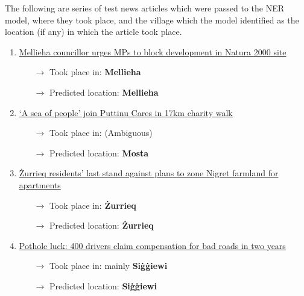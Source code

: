 \documentclass[a4paper, oneside, 11pt]{article}
\begin{document}
\begin{multicols*}{2}
  The following are series of test news articles which were passed to the NER model, where they took place, and the village which the model identified as the location (if any) in which the article took place.

  \begin{enumerate}
    \item \href{https://newsbook.com.mt/en/mellieha-councillor-urges-mps-to-block-development-in-natura-2000-site/}{Mellieha councillor urges MPs to block development in Natura 2000 site}
          \begin{itemize}
            \item[$\rightarrow$] Took place in: \textbf{Mellieha}
            \item[$\rightarrow$] Predicted location: \textbf{Mellieha}
          \end{itemize}
          \item\href{https://newsbook.com.mt/en/a-sea-of-people-join-puttinu-cares-in-17km-charity-walk/}{`A sea of people' join Puttinu Cares in 17km charity walk}
          \begin{itemize}
            \item[$\rightarrow$] Took place in: (Ambiguous)
            \item[$\rightarrow$] Predicted location: \textbf{Mosta}
          \end{itemize}
          \item\href{https://newsbook.com.mt/en/zurrieq-residents-last-stand-against-plans-to-zone-nigret-farmland-for-apartments/}{Żurrieq residents’ last stand against plans to zone Nigret farmland for apartments}
          \begin{itemize}
            \item[$\rightarrow$] Took place in: \textbf{Żurrieq}
            \item[$\rightarrow$] Predicted location: \textbf{Żurrieq}
          \end{itemize}

          \item\href{https://timesofmalta.com/articles/view/pothole-luck-400-drivers-claim-compensation-bad-roads-two-years.1032416}{Pothole luck: 400 drivers claim compensation for bad roads in two years}
          \begin{itemize}
            \item[$\rightarrow$] Took place in: mainly \textbf{Siġġiewi}
            \item[$\rightarrow$] Predicted location: \textbf{Siġġiewi}
          \end{itemize}
  \end{enumerate}


\end{multicols*}
\end{document}
